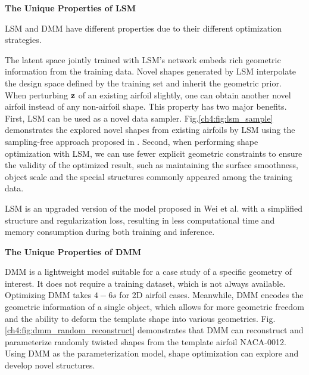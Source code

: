 


\noindent\textbf{The Unique Properties of LSM}

LSM and DMM have different properties due to their different optimization strategies.

The latent space jointly trained with LSM's network embeds rich geometric information from the training data. Novel shapes generated by LSM interpolate the design space defined by the training set and inherit the geometric prior. When perturbing $\mathbf{z}$ of an existing airfoil slightly, one can obtain another novel airfoil instead of any non-airfoil shape. This property has two major benefits. First, LSM can be used as a novel data sampler. Fig.\ref{ch4:fig:lsm_sample} demonstrates the explored novel shapes from existing airfoils by LSM using the sampling-free approach proposed in \cite{ai.Shen2021b}. Second, when performing shape optimization with LSM, we can use fewer explicit geometric constraints to ensure the validity of the optimized result, such as maintaining the surface smoothness, object scale and the special structures commonly appeared among the training data.

LSM is an upgraded version of the model proposed in Wei et al. \cite{aa.Wei2023} with a simplified structure and regularization loss, resulting in less computational time and memory consumption during both training and inference.

\noindent\textbf{The Unique Properties of DMM}

DMM is a lightweight model suitable for a case study of a specific geometry of interest. It does not require a training dataset, which is not always available. Optimizing DMM takes $4-6s$ for 2D airfoil cases. Meanwhile, DMM encodes the geometric information of a single object, which allows for more geometric freedom and the ability to deform the template shape into various geometries. Fig.\ref{ch4:fig:dmm_random_reconstruct} demonstrates that DMM can reconstruct and parameterize randomly twisted shapes from the template airfoil NACA-0012. Using DMM as the parameterization model, shape optimization can explore and develop novel structures.

